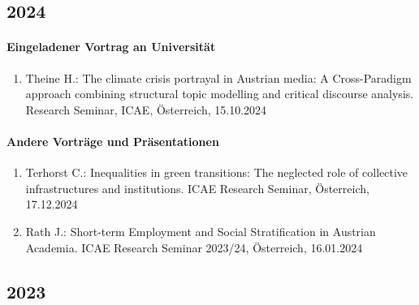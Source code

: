 \subsection*{2024}
\paragraph{Eingeladener Vortrag an Universität}
\begin{enumerate}
	\item Theine H.: The climate crisis portrayal in Austrian media:  A Cross-Paradigm approach combining structural topic modelling and critical discourse analysis. Research Seminar, ICAE, Österreich, 15.10.2024
\end{enumerate}
\paragraph{Andere Vorträge und Präsentationen}
\begin{enumerate}
	\item Terhorst C.: Inequalities in green transitions: The neglected role of collective infrastructures and institutions. ICAE Research Seminar, Österreich, 17.12.2024
	\item Rath J.: Short-term Employment and Social Stratification in Austrian Academia. ICAE Research Seminar 2023/24, Österreich, 16.01.2024
\end{enumerate}
\subsection*{2023}
